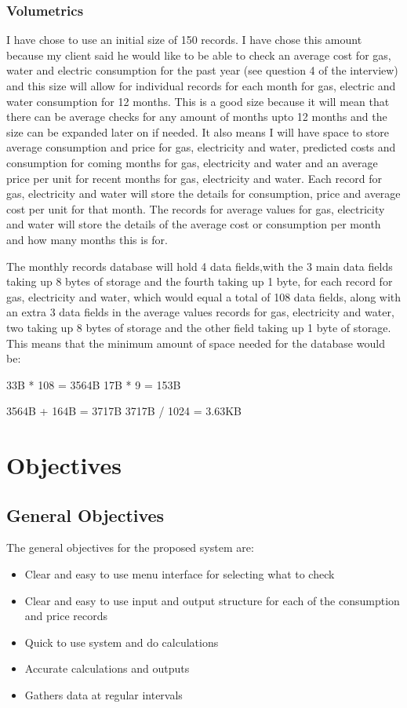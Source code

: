 \subsubsection{Volumetrics}
I have chose to use an initial size of 150 records. I have chose this amount because my client said he would like to be able to check an average cost for gas, water and electric consumption for the past year (see question 4 of the interview) and this size will allow for individual records for each month for gas, electric and water consumption for 12 months. This is a good size because it will mean that there can be average checks for any amount of months upto 12 months and the size can be expanded later on if needed. It also means I will have space to store average consumption and price for gas, electricity and water, predicted costs and consumption for coming months for gas, electricity and water and an average price per unit for recent months for gas, electricity and water. Each record for gas, electricity and water will store the details for consumption, price and average cost per unit for that month. The records for average values for gas, electricity and water will store the details of the average cost or consumption per month and how many months this is for.

The monthly records database will hold 4 data fields,with the 3 main data fields taking up 8 bytes of storage and the fourth taking up 1 byte, for each record for gas, electricity and water, which would equal a total of 108 data fields, along with an extra 3 data fields in the average values records for gas, electricity and water, two taking up 8 bytes of storage and the other field taking up 1 byte of storage. This means that the minimum amount of space needed for the database would be:

33B * 108 = 3564B
17B * 9 = 153B

3564B + 164B = 3717B
3717B / 1024 = 3.63KB

\section{Objectives}

\subsection{General Objectives}
The general objectives for the proposed system are:
\begin{itemize}
	\item Clear and easy to use menu interface for selecting what to check
	\item Clear and easy to use input and output structure for each of the consumption and price records
	\item Quick to use system and do calculations
	\item Accurate calculations and outputs
	\item Gathers data at regular intervals
\end{itemize}
